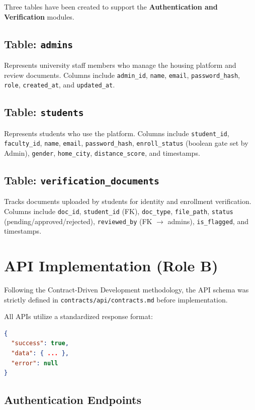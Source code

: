 \documentclass[12pt,a4paper]{article}
\begin{document}
Three tables have been created to support the \textbf{Authentication and Verification} modules.

\subsection{Table: \texttt{admins}}
Represents university staff members who manage the housing platform and review documents.
Columns include \texttt{admin\_id}, \texttt{name}, \texttt{email}, \texttt{password\_hash}, \texttt{role}, \texttt{created\_at}, and \texttt{updated\_at}.

\subsection{Table: \texttt{students}}
Represents students who use the platform.
Columns include \texttt{student\_id}, \texttt{faculty\_id}, \texttt{name}, \texttt{email}, \texttt{password\_hash}, \texttt{enroll\_status} (boolean gate set by Admin), \texttt{gender}, \texttt{home\_city}, \texttt{distance\_score}, and timestamps.

\subsection{Table: \texttt{verification\_documents}}
Tracks documents uploaded by students for identity and enrollment verification.
Columns include \texttt{doc\_id}, \texttt{student\_id} (FK), \texttt{doc\_type}, \texttt{file\_path}, \texttt{status} (pending/approved/rejected), \texttt{reviewed\_by} (FK $\rightarrow$ admins), \texttt{is\_flagged}, and timestamps.

\section{API Implementation (Role B)}

Following the Contract-Driven Development methodology, the API schema was strictly defined in \texttt{contracts/api/contracts.md} before implementation.

All APIs utilize a standardized response format:
\begin{lstlisting}[language=json]
{
  "success": true,
  "data": { ... },
  "error": null
}
\end{lstlisting}

\subsection{Authentication Endpoints}
\end{document}
